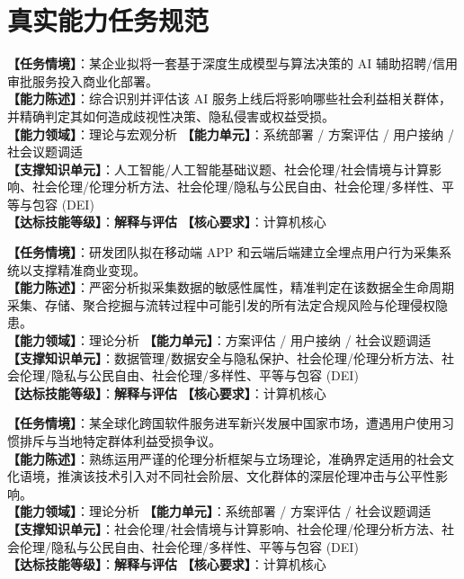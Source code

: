 \section{真实能力任务规范}

\begin{taskbox}
\textbf{【任务情境】}：某企业拟将一套基于深度生成模型与算法决策的 AI 辅助招聘/信用审批服务投入商业化部署。\\
\textbf{【能力陈述】}：综合识别并评估该 AI 服务上线后将影响哪些社会利益相关群体，并精确判定其如何造成歧视性决策、隐私侵害或权益受损。\\
\textbf{【能力领域】}：理论与宏观分析 \quad \textbf{【能力单元】}：系统部署 / 方案评估 / 用户接纳 / 社会议题调适\\
\textbf{【支撑知识单元】}：人工智能/人工智能基础议题、社会伦理/社会情境与计算影响、社会伦理/伦理分析方法、社会伦理/隐私与公民自由、社会伦理/多样性、平等与包容 (DEI)\\
\textbf{【达标技能等级】}：\textbf{解释与评估} \quad \textbf{【核心要求】}：计算机核心
\end{taskbox}

\begin{taskbox}
\textbf{【任务情境】}：研发团队拟在移动端 APP 和云端后端建立全埋点用户行为采集系统以支撑精准商业变现。\\
\textbf{【能力陈述】}：严密分析拟采集数据的敏感性属性，精准判定在该数据全生命周期采集、存储、聚合挖掘与流转过程中可能引发的所有法定合规风险与伦理侵权隐患。\\
\textbf{【能力领域】}：理论分析 \quad \textbf{【能力单元】}：方案评估 / 用户接纳 / 社会议题调适\\
\textbf{【支撑知识单元】}：数据管理/数据安全与隐私保护、社会伦理/伦理分析方法、社会伦理/隐私与公民自由、社会伦理/多样性、平等与包容 (DEI)\\
\textbf{【达标技能等级】}：\textbf{解释与评估} \quad \textbf{【核心要求】}：计算机核心
\end{taskbox}

\begin{taskbox}[任务 3：评估文化因素在技术产品采纳与社会公平中的决定性角色]
\textbf{【任务情境】}：某全球化跨国软件服务进军新兴发展中国家市场，遭遇用户使用习惯排斥与当地特定群体利益受损争议。\\
\textbf{【能力陈述】}：熟练运用严谨的伦理分析框架与立场理论，准确界定适用的社会文化语境，推演该技术引入对不同社会阶层、文化群体的深层伦理冲击与公平性影响。\\
\textbf{【能力领域】}：理论分析 \quad \textbf{【能力单元】}：系统部署 / 方案评估 / 社会议题调适\\
\textbf{【支撑知识单元】}：社会伦理/社会情境与计算影响、社会伦理/伦理分析方法、社会伦理/隐私与公民自由、社会伦理/多样性、平等与包容 (DEI)\\
\textbf{【达标技能等级】}：\textbf{解释与评估} \quad \textbf{【核心要求】}：计算机核心
\end{taskbox}

